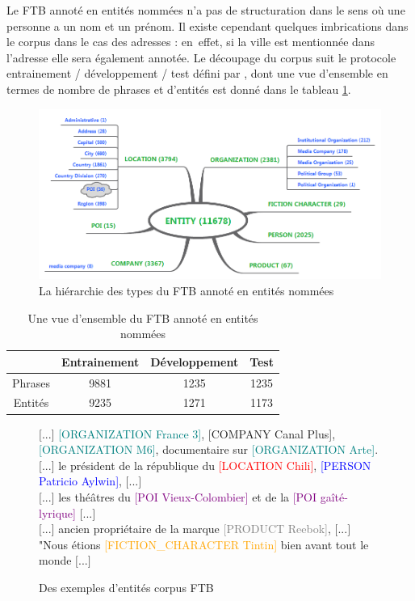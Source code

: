 \documentclass[PhD-Yoann-Dupont.tex]{subfiles}
\begin{document}
Le FTB annoté en entités nommées n'a pas de structuration dans le sens où une personne a un nom et un prénom. Il existe cependant quelques imbrications dans le corpus dans le cas des adresses : en\ effet, si la ville est mentionnée dans l'adresse elle sera également annotée. Le découpage du corpus suit le protocole entrainement / développement / test défini par \citet{crabbe08}, dont une vue d'ensemble en termes de nombre de phrases et d'entités est donné dans le tableau \ref{tab:ftb6-overview}.

\begin{figure}[ht!]
\centering
\includegraphics[scale=0.4]{images/comparo-FTB6/entities}
\caption{La hiérarchie des types du FTB annoté en entités nommées}
\label{fig:ftb6-hierarchy}
\end{figure}

\begin{table}[ht!]
\centering
\begin{tabular}{|c|c|c|c|}
\cline{2-4}
\multicolumn{1}{c|}{ } & Entrainement & Développement & Test \\
\hline
Phrases    & 9881 & 1235 & 1235 \\
Entités    & 9235 & 1271 & 1173 \\
\hline
\end{tabular}
\caption{Une vue d'ensemble du FTB annoté en entités nommées}
\label{tab:ftb6-overview}
\end{table}

\begin{figure}[ht!]
\begin{helvetica}
\small
$[$...$]$ \textcolor{teal}{[ORGANIZATION France 3]}, \textcolor{green!50!black}{[COMPANY Canal Plus]}, \textcolor{teal}{[ORGANIZATION M6]}, documentaire sur \textcolor{teal}{[ORGANIZATION Arte]}.\\
$[$...$]$ le président de la république du \textcolor{red}{[LOCATION Chili]}, \textcolor{blue}{[PERSON Patricio Aylwin]}, $[$...$]$ \\
$[$...$]$ les théâtres du \textcolor{purple}{[POI Vieux-Colombier]} et de la \textcolor{purple}{[POI gaîté-lyrique]} $[$...$]$ \\
$[$...$]$ ancien propriétaire de la marque \textcolor{gray}{[PRODUCT Reebok]}, $[$...$]$ \\
"Nous étions \textcolor{orange}{[FICTION\_CHARACTER Tintin]} bien avant tout le monde $[$...$]$
\end{helvetica}
\caption{Des exemples d'entités corpus FTB}
\label{fig:FTB-examples}
\end{figure}
\end{document}
